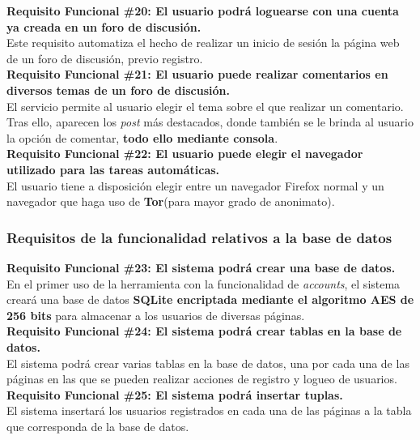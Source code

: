 \begin{adjustwidth}{0.5cm}{}
	\linebreak	
	\textbf{Requisito Funcional \#20: El usuario podrá loguearse con una cuenta ya creada en un foro de discusión.}\\
	Este requisito automatiza el hecho de realizar un inicio de sesión la página web de un foro de discusión, previo registro. \\
	\linebreak	
	\textbf{Requisito Funcional \#21: El usuario puede realizar comentarios en diversos temas de un foro de discusión.}\\
	El servicio permite al usuario elegir el tema sobre el que realizar un comentario. Tras ello, aparecen los \textit{post} más destacados, donde también se le brinda al usuario la opción de comentar, \textbf{todo ello mediante consola}.\\			
	\linebreak		
	\textbf{Requisito Funcional \#22: El usuario puede elegir el navegador utilizado para las tareas automáticas.}\\
	El usuario tiene a disposición elegir entre un navegador Firefox normal y un navegador que haga uso de \textbf{Tor}(para mayor grado de anonimato).\\				
\end{adjustwidth}
\subsubsection{Requisitos de la funcionalidad relativos a la base de datos}
\begin{adjustwidth}{0.5cm}{}
	\textbf{Requisito Funcional \#23: El sistema podrá crear una base de datos.}\\
	En el primer uso de la herramienta con la funcionalidad de \textit{accounts}, el sistema creará una base de datos \textbf{SQLite encriptada mediante el algoritmo AES de 256 bits} para almacenar a los usuarios de diversas páginas. \\
	\linebreak		
	\textbf{Requisito Funcional \#24: El sistema podrá crear tablas en la base de datos.}\\
	El sistema podrá crear varias tablas en la base de datos, una por cada una de las páginas en las que se pueden realizar acciones de registro y logueo de usuarios. \\
	\linebreak		
	\textbf{Requisito Funcional \#25: El sistema podrá insertar tuplas.}\\
	El sistema insertará los usuarios registrados en cada una de las páginas a la tabla que corresponda de la base de datos. \\	
	\linebreak			
\end{adjustwidth}
